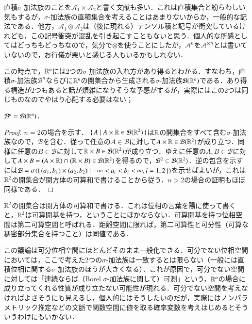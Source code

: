 \begin{dig}
直積$\sigma$-加法族のことを$\mathcal{A}_1 \times \mathcal{A}_2$と書く文献も多い．これは直積集合と紛らわしい気もするが，$\sigma$-加法族の直積集合を考えることはあまりないからか，一般的な記法である．他方，$\mathcal{A}_1 \otimes \mathcal{A}_2$は（後に現れる）テンソル積と記号が衝突しているけれども，この記号衝突が混乱を引き起こすこともないと思う．個人的な所感としてはどっちもどっちなので，気分で$\otimes$を使うことにしたが，$\mathcal{A}^{n}$を$\mathcal{A}^{\otimes n}$とは書いていないので，お行儀が悪いと感じる人もいるかもしれない．
\end{dig}

この時点で，$\mathbb{R}^n$には2つの$\sigma$-加法族の入れ方があり得るとわかる．すなわち，直積$\sigma$-加法族$\mathcal{B}^n$ならびに$\mathbb{R}^n$の開集合から生成される$\sigma$-加法族$\mathcal{B}(\mathbb{R}^n)$である．あり得る構造が2つもあると話が煩雑になりそうな予感がするが，実際にはこの2つは同じものなのでやはり心配する必要はない；

\begin{prop}
$\mathcal{B}^n = \mathcal{B}(\mathbb{R}^n)$．
\end{prop}

\begin{proof}$n=2$の場合を示す．
$\set{A | A \times \mathbb{R}\in \mathcal{B}(\mathbb{R}^2)}$は$\mathbb{R}$の開集合をすべて含む$\sigma$-加法族なので，$\mathcal{B}$を含む．従って任意の$A \in \mathcal{B}$に対して$A \times \mathbb{R} \in \mathcal{B}(\mathbb{R}^2)$が成り立つ．同様に任意の$B \in \mathcal{B}$に対して$\mathbb{R} \times B \in \mathcal{B}(\mathbb{R}^2)$が成り立つ．ゆえに任意の$A,B \in \mathcal{B}$に対して$A \times B = (A \times \mathbb{R}) \cap (\mathbb{R} \times B)  \in \mathcal{B}(\mathbb{R}^2)$を得るので，$\mathcal{B}^2 \subset \mathcal{B}(\mathbb{R}^2)$．逆の包含を示すには$\mathcal{B} = \sigma(\set{(a_1, b_1) \times (a_2,b_2)| -\infty<a_i < b_i < \infty, i=1,2})$を示せばよいが，これは$\mathbb{R}^2$の開集合が開方体の可算和で書けることから従う．$n>2$の場合の証明もほぼ同様である．
\end{proof}

\begin{que}[*]
$\mathbb{R}^2$の開集合は開方体の可算和で書ける．これは位相の言葉を陽に使って書くと，$\mathbb{R}^2$は可算開基を持つ，ということにほかならない．可算開基を持つ位相空間は第二可算空間と呼ばれる．距離空間に限れば，第二可算性と可分性（可算な稠密部分集合を持つこと）は同値である．
\end{que}

\begin{que}[**]
この議論は可分位相空間にほとんどそのまま一般化できる．可分でない位相空間においては，ここで考えた2つの$\sigma$-加法族は一致するとは限らない（一般には直積位相に関する$\sigma$-加法族のほうが大きくなる）．これが原因で，可分でない空間に対しては「連続ならば（Borel $\sigma$-加法族に関して）可測」という，$\mathbb{R}^n$の場合に成り立ってくれる性質が成り立たない可能性が現れる．可分でない空間を考えなければよさそうにも見えるし，個人的にはそうしたいのだが，実際にはノンパラメトリック推定などの文脈で関数空間に値を取る確率変数を考えはじめるとそういうわけにもいかない．
\end{que}


